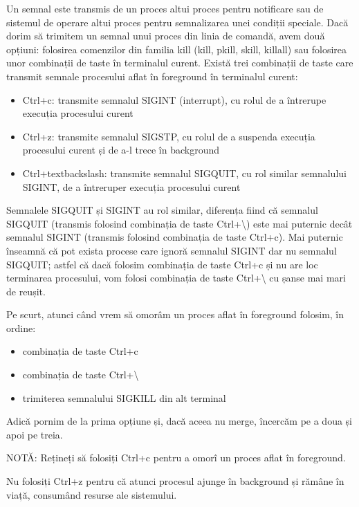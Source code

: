 Un semnal este transmis de un proces altui proces pentru notificare sau de
sistemul de operare altui proces pentru semnalizarea unei condiții speciale.
Dacă dorim să trimitem un semnal unui proces din linia de comandă, avem două
opțiuni: folosirea comenzilor din familia kill (kill, pkill, skill, killall) sau
folosirea unor combinații de taste în terminalul curent. Există trei combinații
de taste care transmit semnale procesului aflat în foreground în terminalul
curent:

\begin{itemize}
	\item Ctrl+c: transmite semnalul SIGINT (interrupt), cu rolul de a
		întrerupe execuția procesului curent
	\item Ctrl+z: transmite semnalul SIGSTP, cu rolul de a suspenda execuția
		procesului curent și de a-l trece în background
	\item Ctrl+textbackslash{}: transmite semnalul SIGQUIT, cu rol similar semnalului
		SIGINT, de a întreruper execuția procesului curent
\end{itemize}

Semnalele SIGQUIT și SIGINT au rol similar, diferența fiind că semnalul SIGQUIT
(transmis folosind combinația de taste Ctrl+\textbackslash{}) este mai puternic
decât semnalul SIGINT (transmis folosind combinația de taste Ctrl+c). Mai
puternic înseamnă că pot exista procese care ignoră semnalul SIGINT dar nu
semnalul SIGQUIT; astfel că dacă folosim combinația de taste Ctrl+c și nu are
loc terminarea procesului, vom folosi combinația de taste Ctrl+\textbackslash{} cu șanse mai
mari de reușit.

Pe scurt, atunci când vrem să omorâm un proces aflat în foreground folosim, în
ordine:

\begin{itemize}
	\item combinația de taste Ctrl+c
	\item combinația de taste Ctrl+\textbackslash{}
	\item trimiterea semnalului SIGKILL din alt terminal
\end{itemize}

Adică pornim de la prima opțiune și, dacă aceea nu merge, încercăm pe a doua și
apoi pe treia.

NOTĂ: Rețineți să folosiți Ctrl+c pentru a omorî un proces aflat în foreground.

Nu folosiți Ctrl+z pentru că atunci procesul ajunge în background și rămâne în
viață, consumând resurse ale sistemului.


